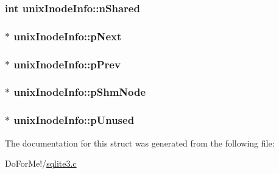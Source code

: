 \hypertarget{structunix_inode_info_a0d7f8dd92964f53e59c8d741dbe00a61}{
\subsubsection[{n\-Shared}]{\setlength{\rightskip}{0pt plus 5cm}int unix\-Inode\-Info\-::n\-Shared}}\label{structunix_inode_info_a0d7f8dd92964f53e59c8d741dbe00a61}
\hypertarget{structunix_inode_info_a80181ba4ef71dd0d8e55e97baedc761e}{
\subsubsection[{p\-Next}]{$\ast$ unix\-Inode\-Info\-::p\-Next}}\label{structunix_inode_info_a80181ba4ef71dd0d8e55e97baedc761e}
\hypertarget{structunix_inode_info_a6575edce9898b48870c6f48047c01d01}{
\subsubsection[{p\-Prev}]{$\ast$ unix\-Inode\-Info\-::p\-Prev}}\label{structunix_inode_info_a6575edce9898b48870c6f48047c01d01}
\hypertarget{structunix_inode_info_a302a8b82e27d5b3624ec122bc9c2ed61}{
\subsubsection[{p\-Shm\-Node}]{$\ast$ unix\-Inode\-Info\-::p\-Shm\-Node}}\label{structunix_inode_info_a302a8b82e27d5b3624ec122bc9c2ed61}
\hypertarget{structunix_inode_info_a0dda9ad35734fa161d1f0b13b671c1c6}{
\subsubsection[{p\-Unused}]{$\ast$ unix\-Inode\-Info\-::p\-Unused}}\label{structunix_inode_info_a0dda9ad35734fa161d1f0b13b671c1c6}


The documentation for this struct was generated from the following file\-:\begin{DoxyCompactItemize}
\item 
Do\-For\-Me!/\hyperlink{sqlite3_8c}{sqlite3.\-c}\end{DoxyCompactItemize}
